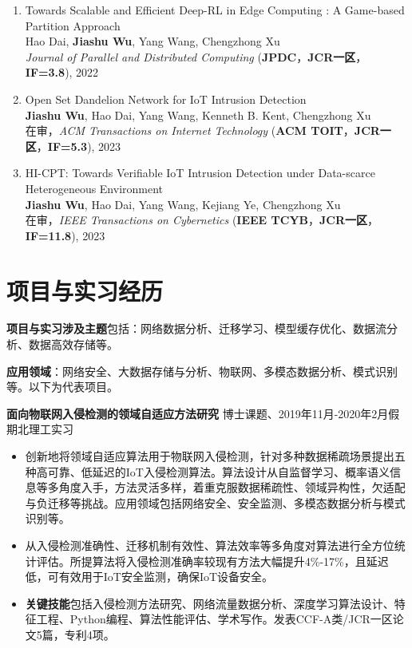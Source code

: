 \documentclass[UTF8,letterpaper,11pt]{article}
\begin{document}
\begin{enumerate}
  \item Towards Scalable and Efficient Deep-RL in Edge Computing : A Game-based Partition Approach\\
  Hao Dai, \textbf{Jiashu Wu}, Yang Wang\textsuperscript{\Letter}, Chengzhong Xu\\
  \textit{Journal of Parallel and Distributed Computing} (\textbf{JPDC}，\textbf{JCR一区}，\textbf{IF=3.8}), 2022

  \item Open Set Dandelion Network for IoT Intrusion Detection\\
  \textbf{Jiashu Wu}, Hao Dai, Yang Wang\textsuperscript{\Letter}, Kenneth B. Kent, Chengzhong Xu\\
  在审，\textit{ACM Transactions on Internet Technology} (\textbf{ACM TOIT}，\textbf{JCR一区}，\textbf{IF=5.3}), 2023
  
  \item HI-CPT: Towards Verifiable IoT Intrusion Detection under Data-scarce Heterogeneous Environment\\
  \textbf{Jiashu Wu}, Hao Dai, Yang Wang\textsuperscript{\Letter}, Kejiang Ye, Chengzhong Xu\\
  在审，\textit{IEEE Transactions on Cybernetics} (\textbf{IEEE TCYB}，\textbf{JCR一区}，\textbf{IF=11.8}), 2023
\end{enumerate}




\section{\textbf{项目与实习经历}}

\textbf{项目与实习涉及主题}包括：网络数据分析、迁移学习、模型缓存优化、数据流分析、数据高效存储等。

\textbf{应用领域}：网络安全、大数据存储与分析、物联网、多模态数据分析、模式识别等。以下为代表项目。

\vspace{2mm}

\textbf{面向物联网入侵检测的领域自适应方法研究} \hfill 博士课题、2019年11月-2020年2月假期北理工实习

\begin{itemize}
  \setlength\itemsep{1.8pt}
  \item 创新地将领域自适应算法用于物联网入侵检测，针对多种数据稀疏场景提出五种高可靠、低延迟的IoT入侵检测算法。算法设计从自监督学习、概率语义信息等多角度入手，方法灵活多样，着重克服数据稀疏性、领域异构性，欠适配与负迁移等挑战。应用领域包括网络安全、安全监测、多模态数据分析与模式识别等。
  \item 从入侵检测准确性、迁移机制有效性、算法效率等多角度对算法进行全方位统计评估。所提算法将入侵检测准确率较现有方法大幅提升4\%-17\%，且延迟低，可有效用于IoT安全监测，确保IoT设备安全。
  \item \textbf{关键技能}包括入侵检测方法研究、网络流量数据分析、深度学习算法设计、特征工程、Python编程、算法性能评估、学术写作。发表CCF-A类/JCR一区论文5篇，专利4项。
\end{itemize}
\end{document}
